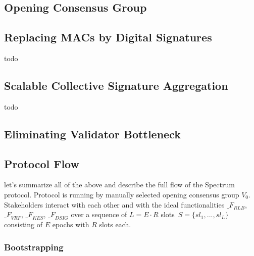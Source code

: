 \subsection{Opening Consensus Group}\label{subsec:opening-consensus-group-and-leaders}


\subsection{Replacing MACs by Digital Signatures}\label{subsec:replacing-macs-by-digital-signatures}

todo

\subsection{Scalable Collective Signature Aggregation}\label{subsec:scalable-collective-signature-aggregation}

todo

\subsection{Eliminating Validator Bottleneck}\label{subsec:eliminating-validator-bottleneck}


\subsection{Protocol Flow}\label{subsec:protocol-flow}
let's summarize all of the above and describe the full flow of the Spectrum protocol.
Protocol is running by manually selected opening consensus group $V_0$.
Stakeholders interact with each other and with the ideal functionalities ${\mathcal_{F}}_{RLB}$,\
${\mathcal_{F}}_{VRF}$, ${\mathcal_{F}}_{KES}$, ${\mathcal_{F}}_{DSIG}$ over a sequence of $L = E \cdot R$ slots\
${S=\{sl_1,...,sl_L\}}$ consisting of $E$ epochs with $R$ slots each.

\subsubsection{Bootstrapping}\label{subsubsec:bootstrapping}

